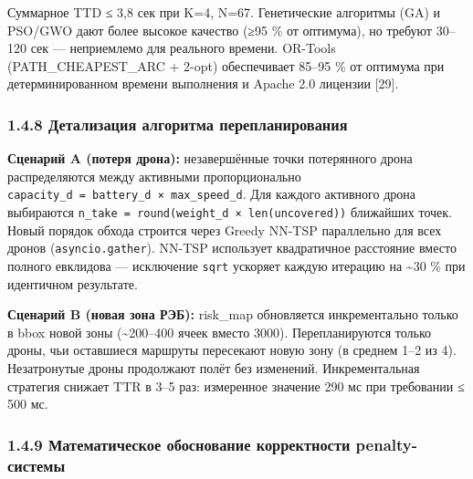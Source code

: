 Суммарное TTD ≤ 3,8 сек при K=4, N=67. Генетические алгоритмы (GA) и PSO/GWO дают более высокое качество (≥95 \% от оптимума), но требуют 30--120 сек --- неприемлемо для реального времени. OR-Tools (PATH\_CHEAPEST\_ARC + 2-opt) обеспечивает 85--95 \% от оптимума при детерминированном времени выполнения и Apache 2.0 лицензии {[}29{]}.

\hypertarget{ux434ux435ux442ux430ux43bux438ux437ux430ux446ux438ux44f-ux430ux43bux433ux43eux440ux438ux442ux43cux430-ux43fux435ux440ux435ux43fux43bux430ux43dux438ux440ux43eux432ux430ux43dux438ux44f}{%
\subsubsection{1.4.8 Детализация алгоритма перепланирования}\label{ux434ux435ux442ux430ux43bux438ux437ux430ux446ux438ux44f-ux430ux43bux433ux43eux440ux438ux442ux43cux430-ux43fux435ux440ux435ux43fux43bux430ux43dux438ux440ux43eux432ux430ux43dux438ux44f}}

\textbf{Сценарий A (потеря дрона):} незавершённые точки потерянного дрона распределяются между активными пропорционально \texttt{capacity\_d\ =\ battery\_d\ ×\ max\_speed\_d}. Для каждого активного дрона выбираются \texttt{n\_take\ =\ round(weight\_d\ ×\ len(uncovered))} ближайших точек. Новый порядок обхода строится через Greedy NN-TSP параллельно для всех дронов (\texttt{asyncio.gather}). NN-TSP использует квадратичное расстояние вместо полного евклидова --- исключение \texttt{sqrt} ускоряет каждую итерацию на \textasciitilde30 \% при идентичном результате.

\textbf{Сценарий B (новая зона РЭБ):} risk\_map обновляется инкрементально только в bbox новой зоны (\textasciitilde200--400 ячеек вместо 3000). Перепланируются только дроны, чьи оставшиеся маршруты пересекают новую зону (в среднем 1--2 из 4). Незатронутые дроны продолжают полёт без изменений. Инкрементальная стратегия снижает TTR в 3--5 раз: измеренное значение 290 мс при требовании ≤ 500 мс.

\hypertarget{ux43cux430ux442ux435ux43cux430ux442ux438ux447ux435ux441ux43aux43eux435-ux43eux431ux43eux441ux43dux43eux432ux430ux43dux438ux435-ux43aux43eux440ux440ux435ux43aux442ux43dux43eux441ux442ux438-penalty-ux441ux438ux441ux442ux435ux43cux44b}{%
\subsubsection{1.4.9 Математическое обоснование корректности penalty-системы}\label{ux43cux430ux442ux435ux43cux430ux442ux438ux447ux435ux441ux43aux43eux435-ux43eux431ux43eux441ux43dux43eux432ux430ux43dux438ux435-ux43aux43eux440ux440ux435ux43aux442ux43dux43eux441ux442ux438-penalty-ux441ux438ux441ux442ux435ux43cux44b}}

